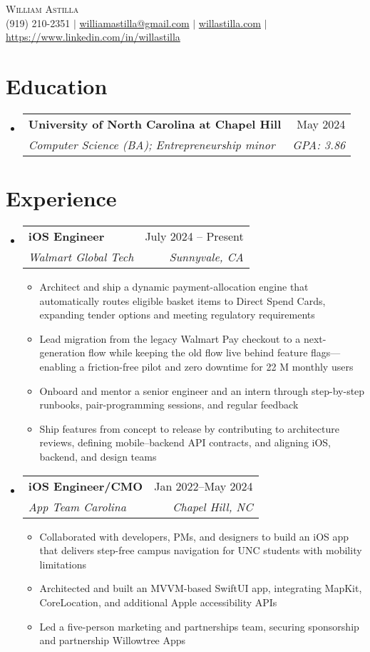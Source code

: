 \documentclass[letterpaper,11pt]{article}
\makeatletter
\newcommand{\resumeItem}[1]{
  \item\small{{#1}}
}
\newcommand{\resumeExperience}[4]{
  \vspace{-2pt}\item
    \begin{tabular*}{0.97\textwidth}[t]{l@{\extracolsep{\fill}}r}
      \textbf{#1} & #2 \\
      \textit{#3} & \textit{#4} \\
    \end{tabular*}
}
\newcommand{\resumeSubheading}[4]{
  \vspace{-2pt}\item
    \begin{tabular*}{0.97\textwidth}[t]{l@{\extracolsep{\fill}}r}
      \textbf{#1} & #2 \\
      \textit{\small#3} & \textit{\small #4} \\
    \end{tabular*}\vspace{-7pt}
}
\newcommand{\resumeSubHeadingListStart}{\begin{itemize}[leftmargin=0.15in, label={}]}
\newcommand{\resumeSubHeadingListEnd}{\end{itemize}}
\newcommand{\resumeItemListStart}{\begin{itemize}}
\newcommand{\resumeItemListEnd}{\end{itemize}\vspace{-5pt}}
\makeatother
\begin{document}
\begin{center}
    {\Huge \scshape William Astilla} \\ \vspace{2pt}
    \small
    (919) 210-2351 $|$ \href{mailto:williamastilla@gmail.com}{williamastilla@gmail.com} $|$ \href{https://www.willastilla.com}{willastilla.com} $|$ \href{linkedin.com/in/willastilla}{https://www.linkedin.com/in/willastilla}
\end{center}

\section{Education}
  \resumeSubHeadingListStart
    \resumeSubheading
      {University of North Carolina at Chapel Hill}{May 2024}
      {Computer Science (BA); Entrepreneurship minor}{\textit{GPA: 3.86}}
  \resumeSubHeadingListEnd

\section{Experience}
  \resumeSubHeadingListStart
  \resumeExperience
    {iOS Engineer}{July 2024 -- Present}{Walmart Global Tech}{Sunnyvale, CA}
    \resumeItemListStart
      \resumeItem{Architect and ship a dynamic payment-allocation engine that automatically routes eligible basket items to Direct Spend Cards, expanding tender options and meeting regulatory requirements}
      \resumeItem{Lead migration from the legacy Walmart Pay checkout to a next-generation flow while keeping the old flow live behind feature flags—enabling a friction-free pilot and zero downtime for 22 M monthly users}
      \resumeItem{Onboard and mentor a senior engineer and an intern through step-by-step runbooks, pair-programming sessions, and regular feedback}
      \resumeItem{Ship features from concept to release by contributing to architecture reviews, defining mobile–backend API contracts, and aligning iOS, backend, and design teams}
    \resumeItemListEnd
    \resumeExperience
      {iOS Engineer/CMO}{Jan 2022--May 2024}{App Team Carolina}{Chapel Hill, NC}
    \resumeItemListStart
      \resumeItem{Collaborated with developers, PMs, and designers to build an iOS app that delivers step-free campus navigation for UNC students with mobility limitations}
      \resumeItem{Architected and built an MVVM-based SwiftUI app, integrating MapKit, CoreLocation, and additional Apple accessibility APIs}
      \resumeItem{Led a five-person marketing and partnerships team, securing sponsorship and partnership Willowtree Apps}
    \resumeItemListEnd
  \resumeSubHeadingListEnd
\end{document}
